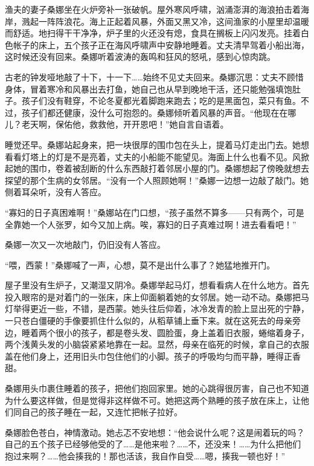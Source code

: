 \documentclass[12pt,UTF-8,openany]{ctexbook}
\begin{document}
\begin{Large}
    
    渔夫的妻子桑娜坐在火炉旁补一张破帆。屋外寒风呼啸，汹涌澎湃的海浪拍击着海岸，溅起一阵阵浪花。海上正起着风暴，外面又黑又冷，这间渔家的小屋里却温暖而舒适。地扫得干干净净，炉子里的火还没有熄，食具在搁板上闪闪发亮。挂着白色帐子的床上，五个孩子正在海风呼啸声中安静地睡着。丈夫清早驾着小船出海，这时候还没有回来。桑娜听着波涛的轰鸣和狂风的怒吼，感到心惊肉跳。
    
    古老的钟发哑地敲了十下，十一下……始终不见丈夫回来。桑娜沉思：丈夫不顾惜身体，冒着寒冷和风暴出去打鱼，她自己也从早到晚地干活，还只能勉强填饱肚子。孩子们没有鞋穿，不论冬夏都光着脚跑来跑去；吃的是黑面包，菜只有鱼。不过，孩子们都还健康，没什么可抱怨的。桑娜倾听着风暴的声音。“他现在在哪儿？老天啊，保佑他，救救他，开开恩吧！”她自言自语着。
    
    睡觉还早。桑娜站起身来，把一块很厚的围巾包在头上，提着马灯走出门去。她想看看灯塔上的灯是不是亮着，丈夫的小船能不能望见。海面上什么也看不见。风掀起她的围巾，卷着被刮断的什么东西敲打着邻居小屋的门。桑娜想起了傍晚就想去探望的那个生病的女邻居。“没有一个人照顾她啊！”桑娜一边想一边敲了敲门。她侧着耳朵听，没有人答应。
    
    “寡妇的日子真困难啊！”桑娜站在门口想，“孩子虽然不算多——只有两个，可是全靠她一个人张罗，如今又加上病。唉，寡妇的日子真难过啊！进去看看吧！”
    
    桑娜一次又一次地敲门，仍旧没有人答应。
    
    “喂，西蒙！”桑娜喊了一声，心想，莫不是出什么事了？她猛地推开门。
    
    屋子里没有生炉子，又潮湿又阴冷。桑娜举起马灯，想看看病人在什么地方。首先投入眼帘的是对着门的一张床，床上仰面躺着她的女邻居。她一动不动。桑娜把马灯举得更近一些，不错，是西蒙。她头往后仰着，冰冷发青的脸上显出死的宁静，一只苍白僵硬的手像要抓住什么似的，从稻草铺上垂下来。就在这死去的母亲旁边，睡着两个很小的孩子，都是卷头发、圆脸蛋，身上盖着旧衣服，蜷缩着身子，两个浅黄头发的小脑袋紧紧地靠在一起。显然，母亲在临死的时候，拿自己的衣服盖在他们身上，还用旧头巾包住他们的小脚。孩子的呼吸均匀而平静，睡得正香甜。
    
    桑娜用头巾裹住睡着的孩子，把他们抱回家里。她的心跳得很厉害，自己也不知道为什么要这样做，但是觉得非这样做不可。她把这两个熟睡的孩子放在床上，让他们同自己的孩子睡在一起，又连忙把帐子拉好。
    
    桑娜脸色苍白，神情激动。她忐忑不安地想：“他会说什么呢？这是闹着玩的吗？自己的五个孩子已经够他受的了……是他来啦？……不，还没来！……为什么把他们抱过来啊？……他会揍我的！那也活该，我自作自受……嗯，揍我一顿也好！”
    

\end{Large}
\end{document}

